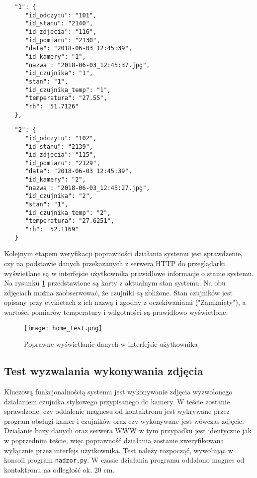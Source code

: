 \documentclass[a4paper,11pt,twoside]{article}
\begin{document}
\begin{minipage}{.5\textwidth}
\begin{lstlisting}
   "1": {
      "id_odczytu": "101",
      "id_stanu": "2140",
      "id_zdjecia": "116",
      "id_pomiaru": "2130",
      "data": "2018-06-03 12:45:39",
      "id_kamery": "1",
      "nazwa": "2018-06-03_12:45:37.jpg",
      "id_czujnika": "1",
      "stan": "1",
      "id_czujnika_temp": "1",
      "temperatura": "27.55",
      "rh": "51.7126"
   },
\end{lstlisting}
\end{minipage}\hfill
\begin{minipage}{.5\textwidth}
\begin{lstlisting}
   "2": {
      "id_odczytu": "102",
      "id_stanu": "2139",
      "id_zdjecia": "115",
      "id_pomiaru": "2129",
      "data": "2018-06-03 12:45:39",
      "id_kamery": "2",
      "nazwa": "2018-06-03_12:45:27.jpg",
      "id_czujnika": "2",
      "stan": "1",
      "id_czujnika_temp": "2",
      "temperatura": "27.6251",
      "rh": "52.1169"
   }
\end{lstlisting}
\end{minipage}

Kolejnym etapem weryfikacji poprawności działania systemu jest sprawdzenie, czy na podstawie danych przekazanych z serwera HTTP do przeglądarki wyświetlane są w interfejsie użytkownika prawidłowe informacje o stanie systemu. Na rysunku \ref{fig: home_test} przedstawione są karty z aktualnym stan systemu. Na obu zdjęciach można zaobserwować, że czujniki są zbliżone. Stan czujników jest opisany przy etykietach z ich nazwą i zgodny z oczekiwaniami ("Zamknięty"), a wartości pomiarów temperatury i wilgotności są prawidłowo wyświetlone.

\begin{figure}
\begin{center}
\texttt{[image: home\_test.png]}
\caption{Poprawne wyświetlanie danych w interfejsie użytkownika}
\label{fig: home_test}
\end{center}
\end{figure}

\subsection{Test wyzwalania wykonywania zdjęcia}
Kluczową funkcjonalnością systemu jest wykonywanie zdjęcia wyzwolonego działaniem czujnika stykowego przypisanego do kamery. W teście zostanie sprawdzone, czy oddalenie magnesu od kontaktronu jest wykrywane przez program obsługi kamer i czujników oraz czy wykonywane jest wówczas zdjęcie. Działanie bazy danych oraz serwera WWW w tym przypadku jest identyczne jak w poprzednim teście, więc poprawność działania zostanie zweryfikowana wyłącznie przez interfejs użytkownika. Test należy rozpocząć, wywołując w konsoli program \texttt{nadzor.py}. W czasie działania programu oddalono magnes od kontaktronu na odległość ok. 20 cm.
\end{document}
